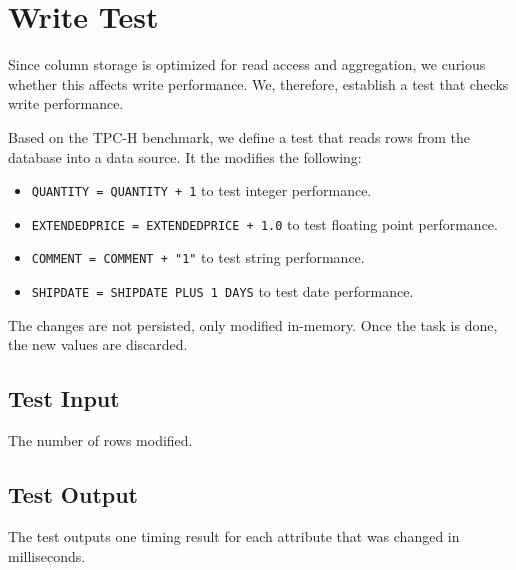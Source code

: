 \section{Write Test}
\label{sec:Write Test}
Since column storage is optimized for read access and aggregation, we curious whether this affects write performance. We, therefore, establish a test that checks write performance. 

Based on the TPC-H benchmark, we define a test that reads rows from the database into a data source. It the modifies the following:
\begin{itemize}
    \item \texttt{QUANTITY = QUANTITY + 1} to test integer performance.
    \item \texttt{EXTENDEDPRICE = EXTENDEDPRICE + 1.0} to test floating point performance.
    \item \texttt{COMMENT = COMMENT + "1"} to test string performance.
    \item \texttt{SHIPDATE = SHIPDATE PLUS 1 DAYS} to test date performance.
\end{itemize}

The changes are not persisted, only modified in-memory. Once the task is done, the new values are discarded.

\subsection{Test Input}
\label{sub:Test Input}
The number of rows modified.

\subsection{Test Output}
\label{sub:Test Output}
The test outputs one timing result for each attribute that was changed in milliseconds.


